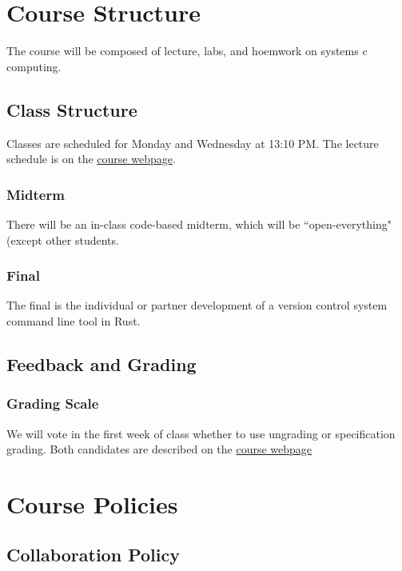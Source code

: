 \documentclass[11pt]{article}
\begin{document}

\section*{Course Structure}

The course will be composed of lecture, labs, and hoemwork on systems c computing.

\subsection*{Class Structure}

Classes are scheduled for Monday and Wednesday at 13:10 PM. The lecture schedule is on the \href{https://cd-c89.github.io/rs}{course webpage}.

\subsubsection*{Midterm}

There will be an in-class code-based midterm, which will be ``open-everything" (except other students.

\subsubsection*{Final}

The final is the individual or partner development of a version control system command line tool in Rust.

\subsection*{Feedback and Grading}

\subsubsection*{Grading Scale}

We will vote in the first week of class whether to use ungrading or specification grading. Both candidates are described on the \href{https://cd-c89.github.io/rs}{course webpage}

\section*{Course Policies}

\subsection*{Collaboration Policy}
\end{document}
